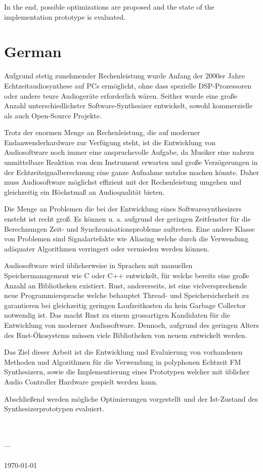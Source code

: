 In the end, possible optimizations are proposed and the state of the implementation prototype is evaluated.

\section*{German}

Aufgrund stetig zunehmender Rechenleistung wurde Anfang der 2000er Jahre Echtzeitaudiosynthese auf PCs ermöglicht, ohne dass spezielle DSP-Prozessoren oder andere teure Audiogeräte erforderlich wären.
Seither wurde eine große Anzahl unterschiedlichster Software-Synthesizer entwickelt, sowohl kommerzielle als auch Open-Source Projekte.

Trotz der enormen Menge an Rechenleistung, die auf moderner Endanwenderhardware zur Verfügung steht, ist die Entwicklung von Audiosoftware noch immer eine anspruchsvolle Aufgabe, da Musiker eine nahezu unmittelbare Reaktion von dem Instrument erwarten und große Verzögerungen in der Echtzeitsignalberechnung eine ganze Aufnahme nutzlos machen könnte.
Daher muss Audiosoftware möglichst effizient mit der Rechenleistung umgehen und gleichzeitig ein Höchstmaß an Audioqualität bieten.

Die Menge an Problemen die bei der Entwicklung eines Softwaresynthesizers ensteht ist recht groß.
Es können u. a. aufgrund der geringen Zeitfenster für die Berechnungen Zeit- und Synchronisationsprobleme auftreten.
Eine andere Klasse von Problemen sind Signalartefakte wie Aliasing welche durch die Verwendung adäquater Algorithmen verringert oder vermieden werden können.

Audiosoftware wird üblicherweise in Sprachen mit manuellen Speichermanagement wie C oder C++ entwickelt, für welche bereits eine große Anzahl an Bibliotheken existiert.
Rust, andererseits, ist eine vielversprechende neue Programmiersprache welche behauptet Thread- und Speichersicherheit zu garantieren bei gleichzeitig geringen Laufzeitkosten da kein Garbage Collector notwendig ist.
Das macht Rust zu einem grossartigen Kandidaten für die Entwicklung von moderner Audiosoftware.
Dennoch, aufgrund des geringen Alters des Rust-Ökosystems müssen viele Bibliotheken von neuem entwickelt werden.

Das Ziel dieser Arbeit ist die Entwicklung und Evaluierung von vorhandenen Methoden und Algorithmen für die Verwendung in polyphonen Echtzeit FM Synthesizern, sowie die Implementierung eines Prototypen welcher mit üblicher Audio Controller Hardware gespielt werden kann.

Abschließend werden mögliche Optimierungen vorgestellt und der Ist-Zustand des Synthesizerprototypen evaluiert.

\begin{center}
	{\sffamily
		\textbf{\documentAuthor{}}\\
		\textsc{\university{}}\\
		\universityFaculty{}---\universityDepartment{}\\
		\documentTitle{}\\
		\germanDate{}\today{}\\
		\bigskip{}
	}
\end{center}